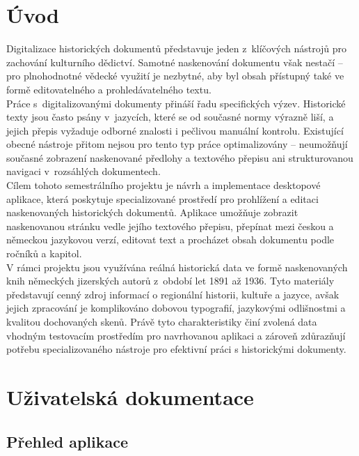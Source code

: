 \documentclass[FM,Proj]{tulthesis}
\begin{document}
	
\chapter{Úvod}

Digitalizace historických dokumentů představuje jeden z~klíčových nástrojů
pro zachování kulturního dědictví. Samotné naskenování dokumentu však nestačí
-- pro plnohodnotné vědecké využití je nezbytné, aby byl obsah přístupný
také ve formě editovatelného a prohledávatelného textu.\\[6pt]

Práce s~digitalizovanými dokumenty přináší řadu specifických výzev. Historické
texty jsou často psány v~jazycích, které se od současné normy výrazně liší,
a jejich přepis vyžaduje odborné znalosti i pečlivou manuální kontrolu.
Existující obecné nástroje přitom nejsou pro tento typ práce optimalizovány
-- neumožňují současné zobrazení naskenované předlohy a textového přepisu
ani strukturovanou navigaci v~rozsáhlých dokumentech.\\[6pt]

Cílem tohoto semestrálního projektu je návrh a implementace desktopové aplikace, která
poskytuje specializované prostředí pro prohlížení a editaci naskenovaných
historických dokumentů. Aplikace umožňuje zobrazit naskenovanou stránku
vedle jejího textového přepisu, přepínat mezi českou a německou jazykovou
verzí, editovat text a procházet obsah dokumentu podle ročníků a kapitol.\\[6pt]

V rámci projektu jsou využívána reálná historická data ve formě naskenovaných knih německých jizerských autorů z~období let 1891 až 1936. Tyto materiály představují cenný zdroj informací o regionální historii, kultuře a jazyce, avšak jejich zpracování je komplikováno dobovou typografií, jazykovými odlišnostmi a kvalitou dochovaných skenů. Právě tyto charakteristiky činí zvolená data vhodným testovacím prostředím pro navrhovanou aplikaci a zároveň zdůrazňují potřebu specializovaného nástroje pro efektivní práci s historickými dokumenty.
		
\chapter{Uživatelská dokumentace}
\section{Přehled aplikace}
\end{document}
